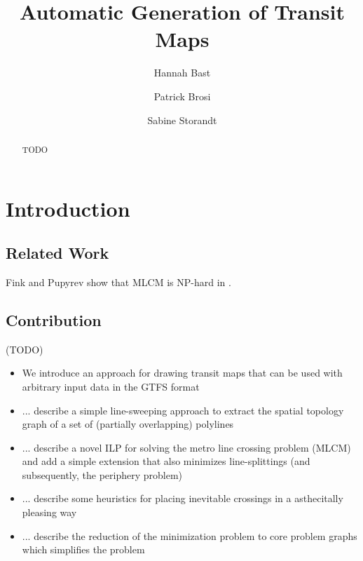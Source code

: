\documentclass{llncs}
\begin{document}
%
\mainmatter              %
%
\title{Automatic Generation of Transit Maps}
%
%
\author{Hannah Bast \and Patrick Brosi \and
Sabine Storandt}
%
%
%

\maketitle              %

\begin{abstract}
TODO
\end{abstract}
%
\section{Introduction}
%
%
\subsection{Related Work}
%
Fink and Pupyrev show that MLCM is NP-hard in \cite{fink:pupyrev}.
%
\subsection{Contribution}
%
(TODO)
\begin{itemize}
\item We introduce an approach for drawing transit maps that can be used with arbitrary input data in the GTFS format
\item ... describe a simple line-sweeping approach to extract the spatial topology graph of a set of (partially overlapping) polylines
\item ... describe a novel ILP for solving the metro line crossing problem (MLCM) and add a simple extension that also minimizes line-splittings (and subsequently, the periphery problem)
\item ... describe some heuristics for placing inevitable crossings in a asthecitally pleasing way
\item ... describe the reduction of the minimization problem to core problem graphs which simplifies the problem
\end{itemize}
%
\end{document}
